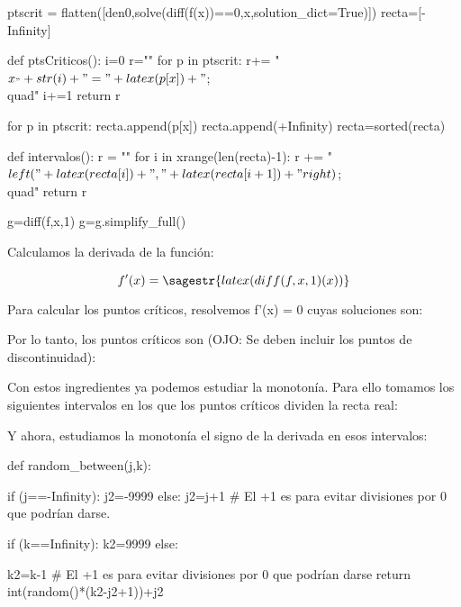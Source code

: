 \documentclass[nochap,palatino]{apuntes}
\begin{document}
\begin{problem}
\begin{sagesilent}
ptscrit = flatten([den0,solve(diff(f(x))==0,x,solution_dict=True)])
recta=[-Infinity]

def ptsCriticos():
    i=0
    r=""
    for p in ptscrit:
        r+= "$x_"+str(i)+"="+latex(p[x])+"$;\\quad"
        i+=1
    return r

for p in ptscrit:
     recta.append(p[x])
recta.append(+Infinity)
recta=sorted(recta)

def intervalos():
    r = ""
    for i in xrange(len(recta)-1):
        r += "$\\left("+latex(recta[i])+","+latex(recta[i+1])+"\\right)$;\\quad"  
    return r

g=diff(f,x,1)
g=g.simplify_full()
\end{sagesilent}

Calculamos la derivada de la función:

\[f'(x) = \sagestr{latex(diff(f,x,1)(x))} \]%

Para calcular los puntos críticos, resolvemos f'(x) = 0 cuyas soluciones son: 

Por lo tanto, los puntos críticos son (OJO: Se deben incluir los puntos de discontinuidad): 


Con estos ingredientes ya podemos estudiar la monotonía. Para ello tomamos los siguientes intervalos en los que los puntos críticos dividen la recta real:


Y ahora, estudiamos la monotonía el signo de la derivada en esos intervalos:
   
\begin{sagesilent}

def random_between(j,k):
    
    if (j==-Infinity):
        j2=-9999
    else:
        j2=j+1 # El +1 es para evitar divisiones por 0 que podrían darse.
        
    if (k==Infinity):
        k2=9999
    else:        
        
        k2=k-1 # El +1 es para evitar divisiones por 0 que podrían darse
    return int(random()*(k2-j2+1))+j2


\end{sagesilent}
\end{problem}
\end{document}
